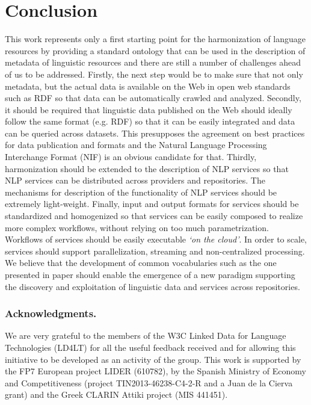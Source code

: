 \documentclass{llncs}
\begin{document}
\section{Conclusion}
\label{sec:conclusion}
This work represents only a first starting point for the harmonization of
language resources by providing a standard ontology that can be used in the
description of metadata of linguistic resources
and there are still a number of challenges
ahead of us to be addressed. Firstly, the next step would be to make sure that
not only metadata, but the actual data is available on the Web in open web
standards such as RDF so that data can be automatically crawled and analyzed.
Secondly, it should be required that linguistic data published on the
Web should ideally follow the same format (e.g. RDF) so that it can be
easily integrated and data can be queried across datasets. This presupposes
the agreement on best practices for data publication and formats and the
Natural Language Processing Interchange Format
(NIF)\cite{hellmann2013integrating} is an obvious candidate for that. Thirdly,
harmonization should be extended to the description of NLP services so that NLP
services can be distributed across providers and repositories. The mechanisms for
description of the functionality of NLP services should be extremely
light-weight. Finally, input and output formats for services should be
standardized and homogenized so that services can be easily composed to realize
more complex workflows, without relying on too much parametrization. Workflows
of services should be easily executable \emph{`on the cloud'}. In order to
scale, services should support parallelization, streaming and 
non-centralized processing. %
We believe that the development of common vocabularies
such as the one presented in paper should enable the emergence of a new paradigm supporting the discovery and exploitation of linguistic data and services across repositories.


\subsubsection*{Acknowledgments.} We are very grateful to the members of the W3C Linked Data for Language Technologies (LD4LT) for all the useful feedback received and for allowing this initiative to be developed as an activity of the group. This work is supported by the FP7 European project LIDER (610782), by the Spanish Ministry of Economy and Competitiveness (project TIN2013-46238-C4-2-R and a Juan de la Cierva grant) and the Greek CLARIN Attiki project (MIS 441451).


\end{document}
